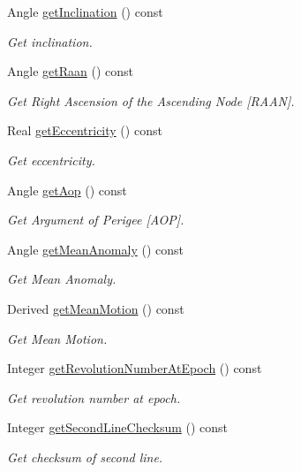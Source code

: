 \begin{DoxyCompactItemize}
Angle \hyperlink{classostk_1_1astro_1_1trajectory_1_1orbit_1_1models_1_1sgp4_1_1_t_l_e_a5e748208f49fc10cc1b925cffa095f67}{get\+Inclination} () const
\begin{DoxyCompactList}\small\item\em Get inclination. \end{DoxyCompactList}\item 
Angle \hyperlink{classostk_1_1astro_1_1trajectory_1_1orbit_1_1models_1_1sgp4_1_1_t_l_e_af8a8a71621c85e1a0eaf4a18fc3f25e4}{get\+Raan} () const
\begin{DoxyCompactList}\small\item\em Get Right Ascension of the Ascending Node \mbox{[}R\+A\+AN\mbox{]}. \end{DoxyCompactList}\item 
Real \hyperlink{classostk_1_1astro_1_1trajectory_1_1orbit_1_1models_1_1sgp4_1_1_t_l_e_a2ea15d6fbdc6e57cfd00547d97467e48}{get\+Eccentricity} () const
\begin{DoxyCompactList}\small\item\em Get eccentricity. \end{DoxyCompactList}\item 
Angle \hyperlink{classostk_1_1astro_1_1trajectory_1_1orbit_1_1models_1_1sgp4_1_1_t_l_e_a8177e2bb63571a511e3e4ea2c853410c}{get\+Aop} () const
\begin{DoxyCompactList}\small\item\em Get Argument of Perigee \mbox{[}A\+OP\mbox{]}. \end{DoxyCompactList}\item 
Angle \hyperlink{classostk_1_1astro_1_1trajectory_1_1orbit_1_1models_1_1sgp4_1_1_t_l_e_ab5c418aedbbfb5b0bc9b401a6d850623}{get\+Mean\+Anomaly} () const
\begin{DoxyCompactList}\small\item\em Get Mean Anomaly. \end{DoxyCompactList}\item 
Derived \hyperlink{classostk_1_1astro_1_1trajectory_1_1orbit_1_1models_1_1sgp4_1_1_t_l_e_a441a9c7ee954d3d97c6d3c6cd5f7cd72}{get\+Mean\+Motion} () const
\begin{DoxyCompactList}\small\item\em Get Mean Motion. \end{DoxyCompactList}\item 
Integer \hyperlink{classostk_1_1astro_1_1trajectory_1_1orbit_1_1models_1_1sgp4_1_1_t_l_e_abc96f40aa52b9451bf791253a61365e9}{get\+Revolution\+Number\+At\+Epoch} () const
\begin{DoxyCompactList}\small\item\em Get revolution number at epoch. \end{DoxyCompactList}\item 
Integer \hyperlink{classostk_1_1astro_1_1trajectory_1_1orbit_1_1models_1_1sgp4_1_1_t_l_e_a66f25eab1f7e8f7e511ad0a77da90de7}{get\+Second\+Line\+Checksum} () const
\begin{DoxyCompactList}\small\item\em Get checksum of second line. \end{DoxyCompactList}\end{DoxyCompactItemize}
